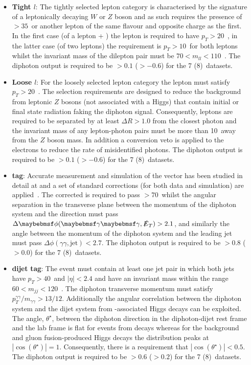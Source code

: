 \begin{itemize}
  \item \textbf{\VH Tight $l$}: The tightly selected lepton category is characterised by the signature of a leptonically decaying $W$ or $Z$ boson and as such requires the presence of \MET$>35$~\GeV or another lepton of the same flavour and opposite charge as the first. In the first case (of a lepton + \MET) the lepton is required to have $p_{T}>20$~\GeV, in the latter case (of two leptons) the requirement is $p_{T}>10$~\GeV for both leptons whilst the invariant mass of the dilepton pair must be $70 < m_{ll} < 110$~\GeV. The diphoton \BDT output is required to be $>0.1$ ($>-0.6$) for the 7 (8)~\TeV datasets.
  \item \textbf{\VH Loose $l$}: For the loosely selected lepton category the lepton \pT must satisfy $p_{T}>20$~\GeV. The selection requirements are designed to reduce the background from leptonic $Z$ bosons (not associated with a Higgs) that contain initial or final state radiation faking the diphoton signal. Consequently, leptons are required to be separated by at least $\Delta R>1.0$ from the closest photon and the invariant mass of any lepton-photon pairs must be more than 10~\GeV away from the $Z$ boson mass. In addition a conversion veto is applied to the electrons to reduce the rate of misidentified photons. The diphoton \BDT output is required to be $>0.1$ ($>-0.6$) for the 7 (8)~\TeV datasets.
  \item \textbf{\VH \MET tag}: Accurate measurement and simulation of the \MET vector has been studied in detail at \CMS and a set of standard corrections (for both data and simulation) are applied~\cite{met_corrs}. The corrected \MET is required to pass \MET$>70$~\GeV whilst the angular separation in the transverse plane between the momentum of the diphoton system and the \MET direction must pass $\Delta\phi(\gamma\gamma,\MET)>2.1$, and similarly the angle between the momentum of the diphoton system and the leading jet must pass $\Delta\phi(\gamma\gamma,\mbox{jet})<2.7$. The diphoton \BDT output is required to be $>0.8$ ($>0.0$) for the 7 (8)~\TeV datasets.   
  \item \textbf{\VH dijet tag}: The event must contain at least one jet pair in which both jets have $p_{T}>40$~\GeV and $|\eta|<2.4$ and have an invariant mass within the range $60<m_{jj}<120$~\GeV. The diphoton transverse momentum must satisfy $p_{T}^{\gamma\gamma}/m_{\gamma\gamma}>13/12$. Additionally the angular correlation between the diphoton system and the dijet system from \VH-associated Higgs decays can be exploited. The angle, $\theta^{\star}$, between the diphoton direction in the diphoton-dijet rest frame and the lab frame is flat for events from \VH decays whereas for the background and gluon fusion-produced Higgs decays the distribution peaks at $|\cos(\theta^{\star})|=1$. Consequently, there is a requirement that $|\cos(\theta^{\star})|<0.5$. The diphoton \BDT output is required to be $>0.6$ ($>0.2$) for the 7 (8)~\TeV datasets. 
\end{itemize}

